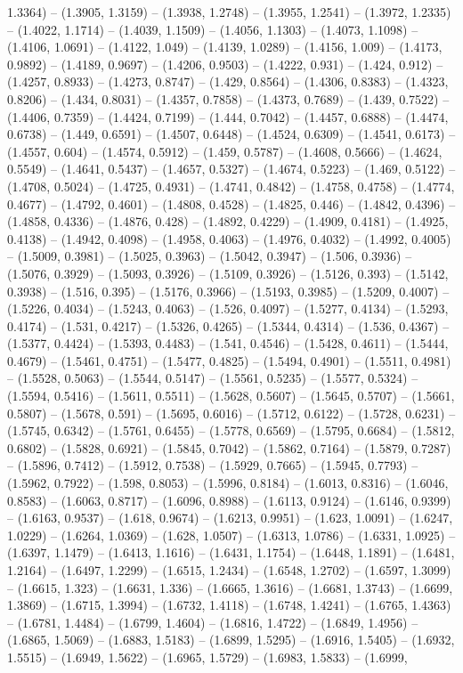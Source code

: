1.3364) -- (1.3905, 1.3159) -- (1.3938, 1.2748) -- (1.3955, 1.2541) -- (1.3972, 1.2335) -- (1.4022, 1.1714) -- (1.4039, 1.1509) -- (1.4056, 1.1303) -- (1.4073, 1.1098) -- (1.4106, 1.0691) -- (1.4122, 1.049) -- (1.4139, 1.0289) -- (1.4156, 1.009) -- (1.4173, 0.9892) -- (1.4189, 0.9697) -- (1.4206, 0.9503) -- (1.4222, 0.931) -- (1.424, 0.912) -- (1.4257, 0.8933) -- (1.4273, 0.8747) -- (1.429, 0.8564) -- (1.4306, 0.8383) -- (1.4323, 0.8206) -- (1.434, 0.8031) -- (1.4357, 0.7858) -- (1.4373, 0.7689) -- (1.439, 0.7522) -- (1.4406, 0.7359) -- (1.4424, 0.7199) -- (1.444, 0.7042) -- (1.4457, 0.6888) -- (1.4474, 0.6738) -- (1.449, 0.6591) -- (1.4507, 0.6448) -- (1.4524, 0.6309) -- (1.4541, 0.6173) -- (1.4557, 0.604) -- (1.4574, 0.5912) -- (1.459, 0.5787) -- (1.4608, 0.5666) -- (1.4624, 0.5549) -- (1.4641, 0.5437) -- (1.4657, 0.5327) -- (1.4674, 0.5223) -- (1.469, 0.5122) -- (1.4708, 0.5024) -- (1.4725, 0.4931) -- (1.4741, 0.4842) -- (1.4758, 0.4758) -- (1.4774, 0.4677) -- (1.4792, 0.4601) -- (1.4808, 0.4528) -- (1.4825, 0.446) -- (1.4842, 0.4396) -- (1.4858, 0.4336) -- (1.4876, 0.428) -- (1.4892, 0.4229) -- (1.4909, 0.4181) -- (1.4925, 0.4138) -- (1.4942, 0.4098) -- (1.4958, 0.4063) -- (1.4976, 0.4032) -- (1.4992, 0.4005) -- (1.5009, 0.3981) -- (1.5025, 0.3963) -- (1.5042, 0.3947) -- (1.506, 0.3936) -- (1.5076, 0.3929) -- (1.5093, 0.3926) -- (1.5109, 0.3926) -- (1.5126, 0.393) -- (1.5142, 0.3938) -- (1.516, 0.395) -- (1.5176, 0.3966) -- (1.5193, 0.3985) -- (1.5209, 0.4007) -- (1.5226, 0.4034) -- (1.5243, 0.4063) -- (1.526, 0.4097) -- (1.5277, 0.4134) -- (1.5293, 0.4174) -- (1.531, 0.4217) -- (1.5326, 0.4265) -- (1.5344, 0.4314) -- (1.536, 0.4367) -- (1.5377, 0.4424) -- (1.5393, 0.4483) -- (1.541, 0.4546) -- (1.5428, 0.4611) -- (1.5444, 0.4679) -- (1.5461, 0.4751) -- (1.5477, 0.4825) -- (1.5494, 0.4901) -- (1.5511, 0.4981) -- (1.5528, 0.5063) -- (1.5544, 0.5147) -- (1.5561, 0.5235) -- (1.5577, 0.5324) -- (1.5594, 0.5416) -- (1.5611, 0.5511) -- (1.5628, 0.5607) -- (1.5645, 0.5707) -- (1.5661, 0.5807) -- (1.5678, 0.591) -- (1.5695, 0.6016) -- (1.5712, 0.6122) -- (1.5728, 0.6231) -- (1.5745, 0.6342) -- (1.5761, 0.6455) -- (1.5778, 0.6569) -- (1.5795, 0.6684) -- (1.5812, 0.6802) -- (1.5828, 0.6921) -- (1.5845, 0.7042) -- (1.5862, 0.7164) -- (1.5879, 0.7287) -- (1.5896, 0.7412) -- (1.5912, 0.7538) -- (1.5929, 0.7665) -- (1.5945, 0.7793) -- (1.5962, 0.7922) -- (1.598, 0.8053) -- (1.5996, 0.8184) -- (1.6013, 0.8316) -- (1.6046, 0.8583) -- (1.6063, 0.8717) -- (1.6096, 0.8988) -- (1.6113, 0.9124) -- (1.6146, 0.9399) -- (1.6163, 0.9537) -- (1.618, 0.9674) -- (1.6213, 0.9951) -- (1.623, 1.0091) -- (1.6247, 1.0229) -- (1.6264, 1.0369) -- (1.628, 1.0507) -- (1.6313, 1.0786) -- (1.6331, 1.0925) -- (1.6397, 1.1479) -- (1.6413, 1.1616) -- (1.6431, 1.1754) -- (1.6448, 1.1891) -- (1.6481, 1.2164) -- (1.6497, 1.2299) -- (1.6515, 1.2434) -- (1.6548, 1.2702) -- (1.6597, 1.3099) -- (1.6615, 1.323) -- (1.6631, 1.336) -- (1.6665, 1.3616) -- (1.6681, 1.3743) -- (1.6699, 1.3869) -- (1.6715, 1.3994) -- (1.6732, 1.4118) -- (1.6748, 1.4241) -- (1.6765, 1.4363) -- (1.6781, 1.4484) -- (1.6799, 1.4604) -- (1.6816, 1.4722) -- (1.6849, 1.4956) -- (1.6865, 1.5069) -- (1.6883, 1.5183) -- (1.6899, 1.5295) -- (1.6916, 1.5405) -- (1.6932, 1.5515) -- (1.6949, 1.5622) -- (1.6965, 1.5729) -- (1.6983, 1.5833) -- (1.6999, 